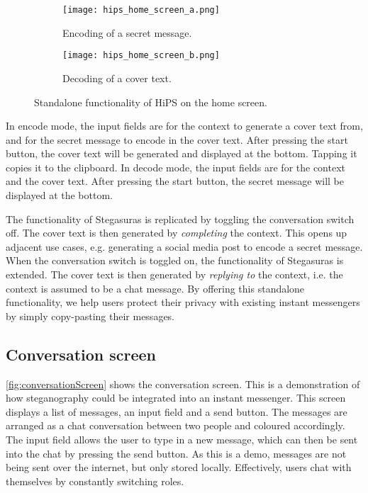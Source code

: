 \begin{figure}
	\begin{wide}
		\captionsetup{width=\linewidth}
		\begin{subfigure}{0.45\linewidth}
			\centering
			\texttt{[image: hips\_home\_screen\_a.png]}
			\caption{Encoding of a secret message.}
			\label{fig:homeScreenA}
		\end{subfigure}
        \hfill
		\begin{subfigure}{0.45\linewidth}
			\centering
			\texttt{[image: hips\_home\_screen\_b.png]}
			\caption{Decoding of a cover text.}
			\label{fig:homeScreenB}
		\end{subfigure}
		\caption[HiPS: Home screen]{Standalone functionality of HiPS on the home screen.}
		\label{fig:homeScreen}
	\end{wide}
\end{figure}

In encode mode, the input fields are for the context to generate a cover text from, and for the secret message to encode in the cover text. After pressing the start button, the cover text will be generated and displayed at the bottom. Tapping it copies it to the clipboard. In decode mode, the input fields are for the context and the cover text. After pressing the start button, the secret message will be displayed at the bottom.

The functionality of Stegasuras is replicated by toggling the conversation switch off. The cover text is then generated by \textit{completing} the context. This opens up adjacent use cases, e.g. generating a social media post to encode a secret message. When the conversation switch is toggled on, the functionality of Stegasuras is extended. The cover text is then generated by \textit{replying to} the context, i.e. the context is assumed to be a chat message. By offering this standalone functionality, we help users protect their privacy with existing instant messengers by simply copy-pasting their messages.

\subsection{Conversation screen}
\label{sec:conversationScreen}
\cref{fig:conversationScreen} shows the conversation screen. This is a demonstration of how steganography could be integrated into an instant messenger. This screen displays a list of messages, an input field and a send button. The messages are arranged as a chat conversation between two people and coloured accordingly. The input field allows the user to type in a new message, which can then be sent into the chat by pressing the send button. As this is a demo, messages are not being sent over the internet, but only stored locally. Effectively, users chat with themselves by constantly switching roles.

